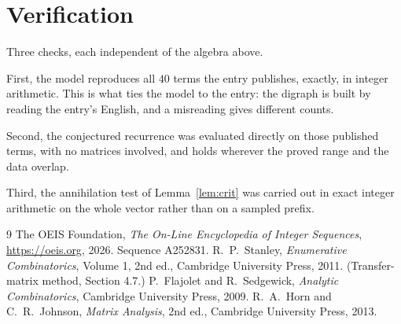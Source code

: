 \documentclass[11pt,a4paper]{article}
\theoremstyle{plain}
\theoremstyle{definition}
\begin{document}
\section{Verification}

Three checks, each independent of the algebra above.

First, the model reproduces all $40$ terms the entry publishes, exactly, in integer
arithmetic. This is what ties the model to the entry: the digraph is built by reading the
entry's English, and a misreading gives different counts.

Second, the conjectured recurrence was evaluated directly on those published terms, with no
matrices involved, and holds wherever the proved range and the data overlap.

Third, the annihilation test of Lemma~\ref{lem:crit} was carried out in exact integer
arithmetic on the whole vector rather than on a sampled prefix.

\begin{thebibliography}{9}
 The OEIS Foundation, \emph{The On-Line Encyclopedia of Integer
Sequences}, \url{https://oeis.org}, 2026. Sequence A252831.
 R.~P.~Stanley, \emph{Enumerative Combinatorics}, Volume 1, 2nd ed.,
Cambridge University Press, 2011. (Transfer-matrix method, Section 4.7.)
 P.~Flajolet and R.~Sedgewick, \emph{Analytic Combinatorics}, Cambridge
University Press, 2009.
 R.~A.~Horn and C.~R.~Johnson, \emph{Matrix Analysis}, 2nd ed., Cambridge
University Press, 2013.
\end{thebibliography}
\end{document}
